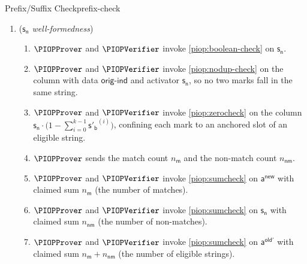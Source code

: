 \begin{DefinePIOP}{Prefix/Suffix Check}{prefix-check}
\begin{enumerate}[nosep]
\begin{enumerate}[nosep]
          \item (\textit{$\mathsf{s_n}$ well-formedness})
          \begin{enumerate}[nosep]
            \item $\PIOPProver$ and $\PIOPVerifier$ invoke \cref{piop:boolean-check} on $\mathsf{s_n}$.
            \item $\PIOPProver$ and $\PIOPVerifier$ invoke \cref{piop:nodup-check} on the column with data $\mathsf{orig\text{-}ind}$ and activator $\mathsf{s_n}$, so no two marks fall in the same string.
            \item $\PIOPProver$ and $\PIOPVerifier$ invoke \cref{piop:zerocheck} on the column $\mathsf{s_n}\cdot\bigl(1-\sum_{i=0}^{k-1}\mathsf{s'_b}^{(i)}\bigr)$, confining each mark to an anchored slot of an eligible string.
            \item $\PIOPProver$ sends the match count $n_{\mathsf{m}}$ and the non-match count $n_{\mathsf{nm}}$.
            \item $\PIOPProver$ and $\PIOPVerifier$ invoke \cref{piop:sumcheck} on $\mathsf{a^{new}}$ with claimed sum $n_{\mathsf{m}}$ (the number of matches).
            \item $\PIOPProver$ and $\PIOPVerifier$ invoke \cref{piop:sumcheck} on $\mathsf{s_n}$ with claimed sum $n_{\mathsf{nm}}$ (the number of non-matches).
            \item $\PIOPProver$ and $\PIOPVerifier$ invoke \cref{piop:sumcheck} on $\mathsf{a^{old'}}$ with claimed sum $n_{\mathsf{m}}+n_{\mathsf{nm}}$ (the number of eligible strings).
          \end{enumerate}
        \end{enumerate}
    \end{enumerate}
\end{DefinePIOP}

